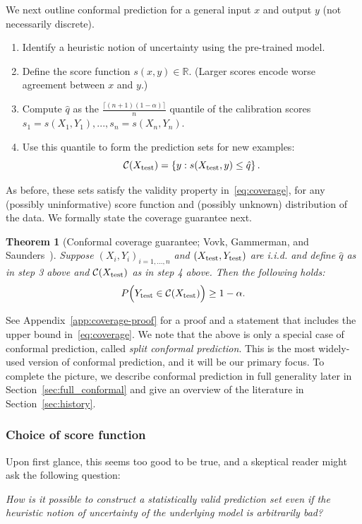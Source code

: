 \documentclass[10pt]{article}
\newtheorem{theorem}{Theorem}
\def\R{\mathbb{R}}
\newcommand{\C}{\mathcal{C}}
\begin{document}
We next outline conformal prediction for a general input $x$ and output $y$ (not necessarily discrete).
\begin{enumerate}
    \item Identify a heuristic notion of uncertainty using the pre-trained model.
    \item Define the score function $s(x,y) \in \R$. (Larger scores encode worse agreement between $x$ and $y$.)
    \item Compute $\hat{q}$ as the $\frac{\lceil (n+1)(1-\alpha) \rceil}{n}$ quantile of the calibration scores $s_1=s(X_1,Y_1),...,s_n=s(X_n,Y_n)$.
    \item Use this quantile to form the prediction sets for new examples:
    \begin{equation} \label{eq:conformal_set} \C(X_{\rm test}) = \left\{y : s(X_{\rm test},y) \le \hat{q}\right\}.\end{equation}
\end{enumerate}
\noindent As before, these sets satisfy the validity property in~\eqref{eq:coverage}, for any (possibly uninformative) score function and (possibly unknown) distribution of the data. We formally state the coverage guarantee next. 
\begin{theorem}[Conformal coverage guarantee; Vovk, Gammerman, and Saunders~\citep{vovk1999machine}]
\label{thm:conformal_calibration}
Suppose $(X_i, Y_i)_{i = 1,\dots,n}$ and $(X_{\rm test}, Y_{\rm test})$ are i.i.d. and define $\hat{q}$ as in step 3 above and $\C(X_{\rm test})$ as in step 4 above. Then the following holds:
\begin{equation*}
P\Big(Y_{\rm test} \in \C(X_{\rm test})\Big) \ge 1 - \alpha.
\end{equation*}
\end{theorem}
See Appendix~\ref{app:coverage-proof} for a proof and a statement that includes the upper bound in~\eqref{eq:coverage}. 
We note that the above is only a special case of conformal prediction, called \emph{split conformal prediction}. This is the most widely-used version of conformal prediction, and it will be our primary focus. 
To complete the picture, we describe conformal prediction in full generality later in Section~\ref{sec:full_conformal} and give an overview of the literature in Section~\ref{sec:history}.

\subsubsection*{Choice of score function}
Upon first glance, this seems too good to be true, and a skeptical reader might ask the following question:
\begin{center}
    \emph{How is it possible to construct a statistically valid prediction set even if the heuristic notion of uncertainty of the underlying model is arbitrarily bad?}
\end{center}
\end{document}
